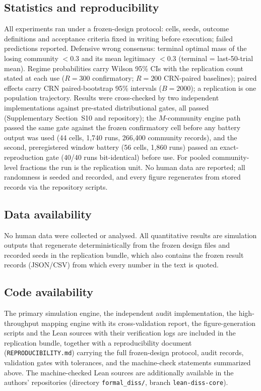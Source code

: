\documentclass[11pt]{article}
\newcommand{\1}{\mathbf{1}}
\begin{document}
\subsection{Statistics and reproducibility}
All experiments ran under a frozen-design protocol: cells, seeds, outcome definitions and acceptance criteria fixed in writing before execution; failed predictions reported. Defensive wrong consensus: terminal optimal mass of the losing community $<0.3$ and its mean legitimacy $<0.3$ (terminal = last-50-trial mean). Regime probabilities carry Wilson 95\% CIs with the replication count stated at each use ($R=300$ confirmatory; $R=200$ CRN-paired baselines); paired effects carry CRN paired-bootstrap 95\% intervals ($B=2000$); a replication is one population trajectory. Results were cross-checked by two independent implementations against pre-stated distributional gates, all passed (Supplementary Section~S10 and repository); the $M$-community engine path passed the same gate against the frozen confirmatory cell before any battery output was used (44 cells, 1,740 runs, 266,400 community records), and the second, preregistered window battery (56 cells, 1,860 runs) passed an exact-reproduction gate (40/40 runs bit-identical) before use. For pooled community-level fractions the run is the replication unit. No human data are reported; all randomness is seeded and recorded, and every figure regenerates from stored records via the repository scripts.

\subsection{Data availability}
No human data were collected or analysed. All quantitative results are simulation outputs that regenerate deterministically from the frozen design files and recorded seeds in the replication bundle, which also contains the frozen result records (JSON/CSV) from which every number in the text is quoted.

\subsection{Code availability}
The primary simulation engine, the independent audit implementation, the high-throughput mapping engine with its cross-validation report, the figure-generation scripts and the Lean sources with their verification logs are included in the replication bundle, together with a reproducibility document (\texttt{REPRODUCIBILITY.md}) carrying the full frozen-design protocol, audit records, validation gates with tolerances, and the machine-check statements summarized above. The machine-checked Lean sources are additionally available in the authors' repositories (directory \texttt{formal\_diss/}, branch \texttt{lean-diss-core}).
\end{document}
